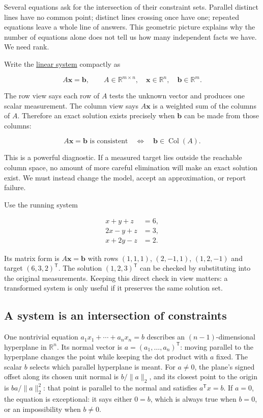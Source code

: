 Several equations ask for the intersection of their constraint sets. Parallel distinct lines have no common point; distinct lines crossing once have one; repeated equations leave a whole line of answers. This geometric picture explains why the number of equations alone does not tell us how many independent facts we have. We need rank.

Write the \hyperref[01-foundations-i-ch019-a-system-is-an-intersection-of-constraints]{linear system} compactly as

\[
A\mathbf x=\mathbf b,
\qquad A\in\mathbb R^{m\times n},\quad
\mathbf x\in\mathbb R^n,\quad\mathbf b\in\mathbb R^m.
\]

The row view says each row of \(A\) tests the unknown vector and produces one scalar measurement. The column view says \(A\mathbf x\) is a weighted sum of the columns of \(A\). Therefore an exact solution exists precisely when \(\mathbf b\) can be made from those columns:

\[
A\mathbf x=\mathbf b\text{ is consistent}
\quad\Longleftrightarrow\quad
\mathbf b\in\operatorname{Col}(A).
\]

This is a powerful diagnostic. If a measured target lies outside the reachable column space, no amount of more careful elimination will make an exact solution exist. We must instead change the model, accept an approximation, or report failure.

Use the running system

\[
\begin{aligned}
x+y+z&=6,\\
2x-y+z&=3,\\
x+2y-z&=2.
\end{aligned}
\]

Its matrix form is \(A\mathbf x=\mathbf b\) with rows \((1,1,1)\), \((2,-1,1)\), \((1,2,-1)\) and target \((6,3,2)^\mathsf T\). The solution \((1,2,3)^\mathsf T\) can be checked by substituting into the original measurements. Keeping this direct check in view matters: a transformed system is only useful if it preserves the same solution set.

\subsection{A system is an intersection of constraints}\label{01-foundations-i-ch019-a-system-is-an-intersection-of-constraints}

One nontrivial equation \(a_1x_1+\cdots+a_nx_n=b\) describes an \((n-1)\)-dimensional hyperplane in \(\mathbb R^n\). Its normal vector is \(a=(a_1,\ldots,a_n)^\mathsf T\): moving parallel to the hyperplane changes the point while keeping the dot product with \(a\) fixed. The scalar \(b\) selects which parallel hyperplane is meant. For \(a\ne0\), the plane's signed offset along its chosen unit normal is \(b/\|a\|_2\), and its closest point to the origin is \(ba/\|a\|_2^2\): that point is parallel to the normal and satisfies \(a^\mathsf Tx=b\). If \(a=0\), the equation is exceptional: it says either \(0=b\), which is always true when \(b=0\), or an impossibility when \(b\ne0\).

